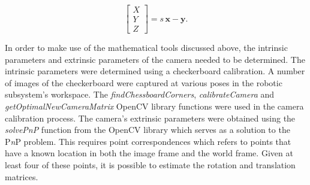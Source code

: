 \begin{equation}
	\begin{bmatrix}
		X \\ 
		Y \\ 
		Z
	\end{bmatrix}=
	s\,\textbf{x}-\textbf{y}.
	\label{eqn:expanded-pinhole-camera-mapping-simplified}
\end{equation}


%

In order to make use of the mathematical tools discussed above, the intrinsic parameters and extrinsic parameters of the camera needed to be determined. The intrinsic parameters were determined using a checkerboard calibration. A number of images of the checkerboard were captured at various poses in the robotic subsystem's workspace. The \textit{findChessboardCorners}, \textit{calibrateCamera} and \textit{getOptimalNewCameraMatrix} OpenCV library functions were used in the camera calibration process. The camera's extrinsic parameters were obtained using the \textit{solvePnP} function from the OpenCV library which serves as a solution to the P\textit{n}P problem. This requires point correspondences which refers to points that have a known location in both the image frame and the world frame. Given at least four of these points, it is possible to estimate the rotation and translation matrices.

